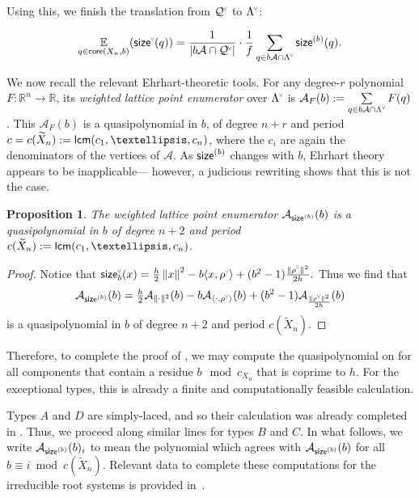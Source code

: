 \documentclass[10pt,a4paper]{amsart}
\newcommand{\defn}[1]{\emph{#1}}
\newcommand{\chk}[1]{#1^{\normalfont\smash{\scalebox{.5}[.5]{\rotatebox{90}{\textbf{\textless}}}}}}
\newcommand{\R}{\mathbb{R}}
\newcommand{\lcm}{{\sf lcm}}
\newcommand{\Expt}[2]{\operatorname*{\mathbb{E}}\limits_{#1}(#2)}
\newcommand{\Q}{\mathcal{Q}}
\newcommand{\ac}{\mathcal{A}}
\newcommand{\core}{{\sf core}}
\newcommand{\cwl}{\chk{\Lambda}}
\newcommand{\size}{{\sf size}}
\newcommand{\sizeb}{\size^{(b)}}
\newtheorem{prop}[theorem]{Proposition}
\theoremstyle{definition}
\theoremstyle{remark}
\begin{document}
Using this, we finish the translation from $\chk{\Q}$ to $\cwl$:

\setcounter{equation}{6}
\begin{equation}
\label{eq:ev_coweight_sum}
\Expt{q \in \core(X_n,b)}{\chk{\size}(q)} = \frac{1}{|b\ac\cap\chk{\Q}|}\cdot \frac{1}{f}\sum_{q\in b\ac\cap\cwl} \sizeb(q).    
\end{equation}

We now recall the relevant Ehrhart-theoretic tools. For any degree-$r$ polynomial $F:\R^n\to\R$, its \defn{weighted lattice point enumerator} over $\cwl$ is
$ \ac_F(b) := \sum\limits_{q\in b\ac\cap\cwl} F(q)$. This $\ac_F(b)$ is a quasipolynomial in $b$, of degree $n+r$ and period $c=c(\widetilde{X}_n):=\lcm(c_1,\dots,c_n)$, where the $c_i$ are again the denominators of the vertices of $\ac$. As $\size^{(b)}$ changes with $b$, Ehrhart theory appears to be inapplicable--- however, a judicious rewriting shows that this is not the case.

\begin{prop}
	The weighted lattice point enumerator $\ac_{\sizeb}(b)$
    is a quasipolynomial in $b$ of degree $n+2$ and period $c(\widetilde{X}_n):=\lcm(c_1,\ldots,c_n)$.
\label{prop:quasipoly}
\end{prop}

\begin{proof}
    Notice that $\chk{\size}_b(x)=\frac{h}{2}\left\|x\right\|^2-b\langle x,\chk{\rho}\rangle+(b^2-1)\frac{\left\|\chk{\rho}\right\|^2}{2h}.$
   Thus we find that
   \[\ac_{\sizeb}(b)={\textstyle\frac{h}{2}}\ac_{\|\cdot\|^2}(b)-b\ac_{\langle\cdot,\chk{\rho}\rangle}(b)+(b^2-1)\ac_{\frac{\left\|\chk{\rho}\right\|^2}{2h}}(b)\]
   is a quasipolynomial in $b$ of degree $n+2$ and period $c(\widetilde{X}_n)$.
\end{proof}

Therefore, to complete the proof of , we may compute the quasipolynomial on for all components that contain a residue $b\mod c_{X_n}$ that is coprime to $h$. For the exceptional types, this is already a finite and computationally feasible calculation. 

Types $A$ and $D$ are simply-laced, and so their calculation was already completed in \cite{thiel2017strange}. Thus, we proceed along similar lines for types $B$ and $C$. In what follows, we write $\ac_{\sizeb}(b)_i$ to mean the polynomial which agrees with $\ac_{\sizeb}(b)$ for all $b\equiv i\bmod c(\widetilde{X}_n)$.  Relevant data to complete these computations for the irreducible root systems is provided in~.
\end{document}
